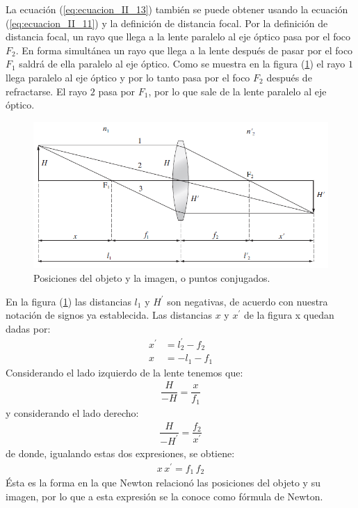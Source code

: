 \documentclass[14pt]{extarticle}
\begin{document}
La ecuación (\ref{eq:ecuacion_II_13}) también se puede obtener usando la ecuación (\ref{eq:ecuacion_II_11}) y la definición de distancia focal. Por la definición de distancia focal, un rayo que llega a la lente paralelo al eje óptico pasa por el foco $F_{2}$. En forma simultánea un rayo que llega a la lente después de pasar por el foco $F_{1}$ saldrá de ella paralelo al eje óptico.
Como se muestra en la figura (\ref{fig:figura_II_04}) el rayo $1$ llega paralelo al eje óptico y por lo tanto pasa por el foco $F_{2}$ después de refractarse. El rayo $2$ pasa por $F_{1}$, por lo que sale de la lente paralelo al eje óptico.
\begin{figure}[H]
    \centering
    \includegraphics[scale=0.75]{Imagenes/Lentes_05.png}
    \caption{Posiciones del objeto y la imagen, o puntos conjugados.}
    \label{fig:figura_II_04}
\end{figure}
En la figura (\ref{fig:figura_II_04}) las distancias $l_{1}$ y $H^{\prime}$ son negativas, de acuerdo con nuestra notación de signos ya establecida. Las distancias $x$ y $x^{\prime}$ de la figura x quedan dadas por:
\begin{eqnarray}
x^{\prime} &= l_{2}^{\prime} - f_{2} \label{eq:ecuacion_II_15} \\[0.5em]
x &= - l_{1} - f_{1} \label{eq:ecuacion_II_16}
\end{eqnarray}
Considerando el lado izquierdo de la lente tenemos que:
\begin{align}
\dfrac{H}{-H} = \dfrac{x}{f_{1}}
\label{eq:ecuacion_II_17}
\end{align}
y considerando el lado derecho:
\begin{align}
\dfrac{H}{-H^{\prime}} = \dfrac{f_{2}}{x^{\prime}}
\label{eq:ecuacion_II_18}
\end{align}
de donde, igualando estas dos expresiones, se obtiene:
\begin{align}
x \, x^{\prime} = f_{1} \, f_{2}
\label{eq:ecuacion_II_19}
\end{align}
Ésta es la forma en la que Newton relacionó las posiciones del objeto y su imagen, por lo que a esta expresión se la conoce como fórmula de Newton.
\end{document}
